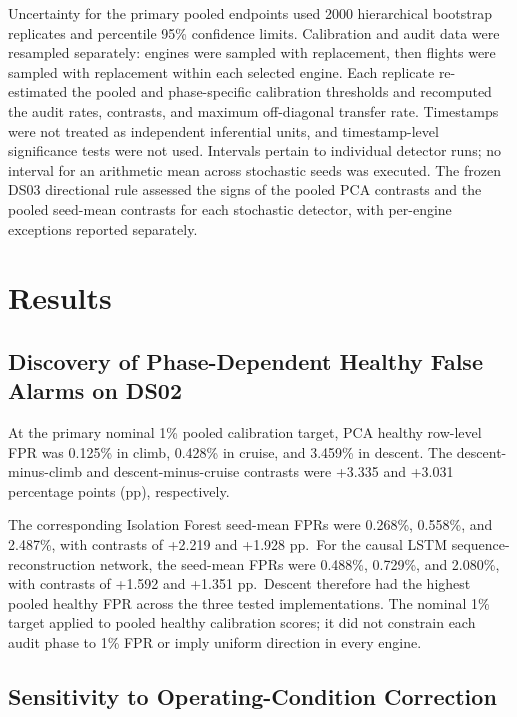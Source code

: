 \documentclass[10pt,conference]{IEEEtran}
\begin{document}
Uncertainty for the primary pooled endpoints used 2000 hierarchical bootstrap replicates and percentile 95\% confidence limits. Calibration and audit data were resampled separately: engines were sampled with replacement, then flights were sampled with replacement within each selected engine. Each replicate re-estimated the pooled and phase-specific calibration thresholds and recomputed the audit rates, contrasts, and maximum off-diagonal transfer rate. Timestamps were not treated as independent inferential units, and timestamp-level significance tests were not used. Intervals pertain to individual detector runs; no interval for an arithmetic mean across stochastic seeds was executed. The frozen DS03 directional rule assessed the signs of the pooled PCA contrasts and the pooled seed-mean contrasts for each stochastic detector, with per-engine exceptions reported separately.

\section{Results}\label{results}

\subsection{Discovery of Phase-Dependent Healthy False Alarms on DS02}\label{discovery-of-phase-dependent-healthy-false-alarms-on-ds02}

At the primary nominal 1\% pooled calibration target, PCA healthy row-level FPR was 0.125\% in climb, 0.428\% in cruise, and 3.459\% in descent. The descent-minus-climb and descent-minus-cruise contrasts were +3.335 and +3.031 percentage points (pp), respectively.

The corresponding Isolation Forest seed-mean FPRs were 0.268\%, 0.558\%, and 2.487\%, with contrasts of +2.219 and +1.928 pp.~For the causal LSTM sequence-reconstruction network, the seed-mean FPRs were 0.488\%, 0.729\%, and 2.080\%, with contrasts of +1.592 and +1.351 pp.~Descent therefore had the highest pooled healthy FPR across the three tested implementations. The nominal 1\% target applied to pooled healthy calibration scores; it did not constrain each audit phase to 1\% FPR or imply uniform direction in every engine.

\subsection{Sensitivity to Operating-Condition Correction}\label{sensitivity-to-operating-condition-correction}
\end{document}
